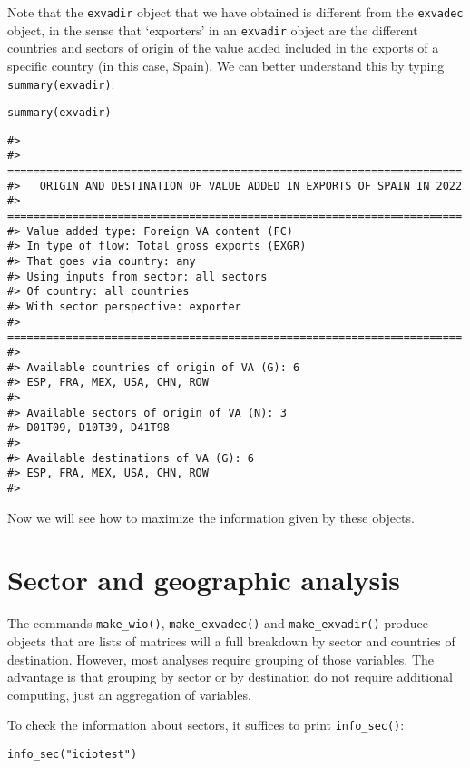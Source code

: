 Note that the \texttt{exvadir} object that we have obtained is different from
the \texttt{exvadec} object, in the sense that `exporters' in an \texttt{exvadir}
object are the different countries and sectors of origin of the value added
included in the exports of a specific country (in this case, Spain). We can
better understand this by typing \texttt{summary(exvadir)}:

\begin{verbatim}
summary(exvadir)
\end{verbatim}

\begin{verbatim}
#> 
#> ====================================================================== 
#>   ORIGIN AND DESTINATION OF VALUE ADDED IN EXPORTS OF SPAIN IN 2022 
#> ====================================================================== 
#> Value added type: Foreign VA content (FC) 
#> In type of flow: Total gross exports (EXGR) 
#> That goes via country: any 
#> Using inputs from sector: all sectors 
#> Of country: all countries 
#> With sector perspective: exporter 
#> ====================================================================== 
#> 
#> Available countries of origin of VA (G): 6 
#> ESP, FRA, MEX, USA, CHN, ROW 
#>  
#> Available sectors of origin of VA (N): 3 
#> D01T09, D10T39, D41T98 
#>  
#> Available destinations of VA (G): 6 
#> ESP, FRA, MEX, USA, CHN, ROW 
#> 
\end{verbatim}

Now we will see how to maximize the information given by these objects.

\hypertarget{sector-and-geographic-analysis}{%
\section{Sector and geographic analysis}\label{sector-and-geographic-analysis}}

The commands \texttt{make\_wio()}, \texttt{make\_exvadec()} and \texttt{make\_exvadir()}
produce objects that are lists of matrices will a full breakdown by sector and
countries of destination. However, most analyses require grouping of those
variables. The advantage is that grouping by sector or by destination do not
require additional computing, just an aggregation of variables.

To check the information about sectors, it suffices to print \texttt{info\_sec()}:

\begin{verbatim}
info_sec("iciotest")
\end{verbatim}

